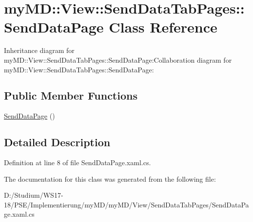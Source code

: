 \hypertarget{classmy_m_d_1_1_view_1_1_send_data_tab_pages_1_1_send_data_page}{
\section{my\-MD::View::Send\-Data\-Tab\-Pages::Send\-Data\-Page Class Reference}
\label{d9/d97/classmy_m_d_1_1_view_1_1_send_data_tab_pages_1_1_send_data_page}
}
Inheritance diagram for my\-MD::View::Send\-Data\-Tab\-Pages::Send\-Data\-Page:Collaboration diagram for my\-MD::View::Send\-Data\-Tab\-Pages::Send\-Data\-Page:\subsection*{Public Member Functions}
\begin{CompactItemize}
\item 
\hypertarget{classmy_m_d_1_1_view_1_1_send_data_tab_pages_1_1_send_data_page_5c3ce375b145a84c70788d2e59019025}{
\hyperlink{classmy_m_d_1_1_view_1_1_send_data_tab_pages_1_1_send_data_page_5c3ce375b145a84c70788d2e59019025}{Send\-Data\-Page} ()}
\label{d9/d97/classmy_m_d_1_1_view_1_1_send_data_tab_pages_1_1_send_data_page_5c3ce375b145a84c70788d2e59019025}

\end{CompactItemize}


\subsection{Detailed Description}




Definition at line 8 of file Send\-Data\-Page.xaml.cs.

The documentation for this class was generated from the following file:\begin{CompactItemize}
\item 
D:/Studium/WS17-18/PSE/Implementierung/my\-MD/my\-MD/View/Send\-Data\-Tab\-Pages/Send\-Data\-Page.xaml.cs\end{CompactItemize}
